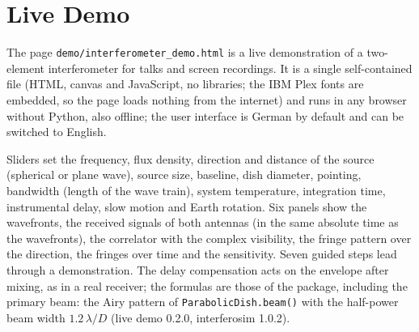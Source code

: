 \section{Live Demo}

The page \texttt{demo/interferometer\_demo.html} is a live demonstration of
a two-element interferometer for talks and screen recordings. It is a
single self-contained file (HTML, canvas and JavaScript, no libraries;
the IBM Plex fonts are embedded, so the page loads nothing from the
internet) and runs in any browser without Python, also offline; the user interface is German by
default and can be switched to English.

Sliders set the frequency, flux density, direction and distance of the
source (spherical or plane wave), source size, baseline, dish diameter,
pointing, bandwidth (length of the wave train), system temperature,
integration time, instrumental delay, slow motion and Earth rotation.
Six panels show the wavefronts, the received signals of both antennas
(in the same absolute time as the wavefronts), the correlator with the
complex visibility, the fringe pattern over the direction, the fringes
over time and the sensitivity. Seven guided steps lead through a
demonstration. The delay compensation acts on the envelope after mixing,
as in a real receiver; the formulas are those of the package, including
the primary beam: the Airy pattern of \texttt{ParabolicDish.beam()} with
the half-power beam width $1.2\,\lambda/D$ (live demo 0.2.0, interferosim
1.0.2).
